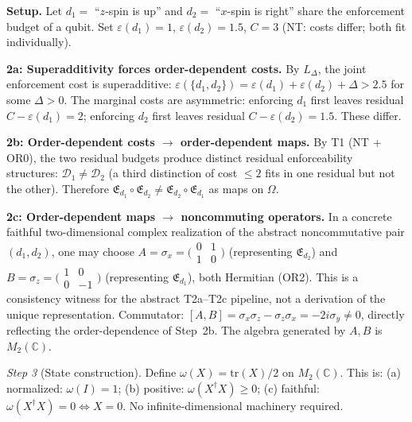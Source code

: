 \documentclass[11pt]{article}
\theoremstyle{remark}
\begin{document}
\begin{tcolorbox}[apfbox, title={T2: Noncommutativity $\to$ Operator Algebra on Hilbert Space}]
\textbf{Setup.}  Let $d_1 = $ ``$z$-spin is up'' and $d_2 = $ ``$x$-spin is right'' share the enforcement budget of a qubit.  Set $\varepsilon(d_1) = 1$, $\varepsilon(d_2) = 1.5$, $C = 3$ (NT: costs differ; both fit individually).

\textbf{2a: Superadditivity forces order-dependent costs.}  By $L_\Delta$, the joint enforcement cost is superadditive: $\varepsilon(\{d_1,d_2\}) = \varepsilon(d_1) + \varepsilon(d_2) + \Delta > 2.5$ for some $\Delta > 0$.  The marginal costs are asymmetric: enforcing $d_1$ first leaves residual $C - \varepsilon(d_1) = 2$; enforcing $d_2$ first leaves residual $C - \varepsilon(d_2) = 1.5$.  These differ.

\textbf{2b: Order-dependent costs $\to$ order-dependent maps.}  By T1 (NT + OR0), the two residual budgets produce distinct residual enforceability structures: $\mathcal{D}_1 \ne \mathcal{D}_2$ (a third distinction of cost $\le 2$ fits in one residual but not the other).  Therefore $\mathfrak{E}_{d_1} \circ \mathfrak{E}_{d_2} \ne \mathfrak{E}_{d_2} \circ \mathfrak{E}_{d_1}$ as maps on $\Omega$.

\textbf{2c: Order-dependent maps $\to$ noncommuting operators.}  In a concrete faithful two-dimensional complex realization of the abstract noncommutative pair $(d_1, d_2)$, one may choose $A = \sigma_x = \bigl(\begin{smallmatrix} 0 & 1 \\ 1 & 0 \end{smallmatrix}\bigr)$ (representing $\mathfrak{E}_{d_2}$) and $B = \sigma_z = \bigl(\begin{smallmatrix} 1 & 0 \\ 0 & -1 \end{smallmatrix}\bigr)$ (representing $\mathfrak{E}_{d_1}$), both Hermitian (OR2).  This is a consistency witness for the abstract T2a--T2c pipeline, not a derivation of the unique representation.  Commutator: $[A, B] = \sigma_x\sigma_z - \sigma_z\sigma_x = -2i\sigma_y \ne 0$, directly reflecting the order-dependence of Step~2b.  The algebra generated by $A, B$ is $M_2(\mathbb{C})$.

\textit{Step 3} (State construction).  Define $\omega(X) = \mathrm{tr}(X)/2$ on $M_2(\mathbb{C})$.  This is: (a) normalized: $\omega(I) = 1$; (b) positive: $\omega(X^\dagger X) \ge 0$; (c) faithful: $\omega(X^\dagger X) = 0 \iff X = 0$.  No infinite-dimensional machinery required.


\end{tcolorbox}
\end{document}
